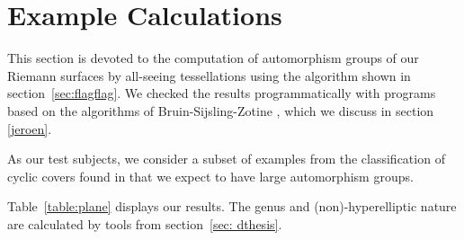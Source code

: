 \documentclass[12pt,reqno]{amsart}
\newcommand{\R}{\mathbb{R}}
\theoremstyle{definition}
\theoremstyle{remark}
\newcommand{\ti}{\todo[inline]}
\begin{document}



\section{Example Calculations}
\label{sec:examples}

This section is devoted to the computation of automorphism groups of our Riemann surfaces by all-seeing tessellations using the algorithm shown in section~\ref{sec:flagflag}. We checked the results programmatically with programs based on the algorithms of Bruin-Sijsling-Zotine \cite{jeroen}, which we discuss in section \ref{jeroen}.

As our test subjects, we consider a subset of examples from the classification of cyclic covers found in \cite{dthesis} that we expect to have large automorphism groups. 





 Table~\ref{table:plane} displays our results. The genus and (non)-hyperelliptic nature are calculated by tools from section~\ref{sec: dthesis}. 
\end{document}
